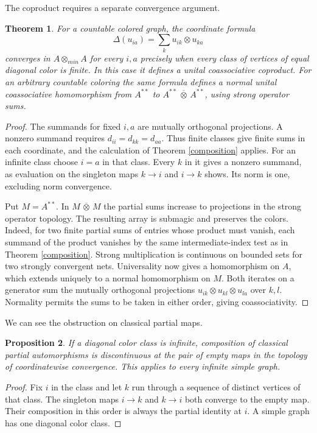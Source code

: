 \documentclass[11pt,a4paper]{article}
\newtheorem{thm}{Theorem}[section]
\newtheorem{prop}[thm]{Proposition}
\begin{document}
The coproduct requires a separate convergence argument.

\begin{thm}\label{infinite}
For a countable colored graph, the coordinate formula
\[
 \Delta(u_{ia})=\sum_k u_{ik}\otimes u_{ka}
\]
converges in $A\otimes_{min}A$ for every $i,a$ precisely when every class of vertices of equal diagonal color is finite. In this case it defines a unital coassociative coproduct. For an arbitrary countable coloring the same formula defines a normal unital coassociative homomorphism from $A^{**}$ to $A^{**}\,\overline\otimes\,A^{**}$, using strong operator sums.
\end{thm}
\begin{proof}
The summands for fixed $i,a$ are mutually orthogonal projections. A nonzero summand requires $d_{ii}=d_{kk}=d_{aa}$. Thus finite classes give finite sums in each coordinate, and the calculation of Theorem \ref{composition} applies. For an infinite class choose $i=a$ in that class. Every $k$ in it gives a nonzero summand, as evaluation on the singleton maps $k\to i$ and $i\to k$ shows. Its norm is one, excluding norm convergence.

Put $M=A^{**}$. In $M\,\overline\otimes\,M$ the partial sums increase to projections in the strong operator topology. The resulting array is submagic and preserves the colors. Indeed, for two finite partial sums of entries whose product must vanish, each summand of the product vanishes by the same intermediate-index test as in Theorem \ref{composition}. Strong multiplication is continuous on bounded sets for two strongly convergent nets. Universality now gives a homomorphism on $A$, which extends uniquely to a normal homomorphism on $M$. Both iterates on a generator sum the mutually orthogonal projections $u_{ik}\otimes u_{kl}\otimes u_{la}$ over $k,l$. Normality permits the sums to be taken in either order, giving coassociativity.
\end{proof}

We can see the obstruction on classical partial maps.

\begin{prop}
If a diagonal color class is infinite, composition of classical partial automorphisms is discontinuous at the pair of empty maps in the topology of coordinatewise convergence. This applies to every infinite simple graph.
\end{prop}
\begin{proof}
Fix $i$ in the class and let $k$ run through a sequence of distinct vertices of that class. The singleton maps $i\to k$ and $k\to i$ both converge to the empty map. Their composition in this order is always the partial identity at $i$. A simple graph has one diagonal color class.
\end{proof}
\end{document}
